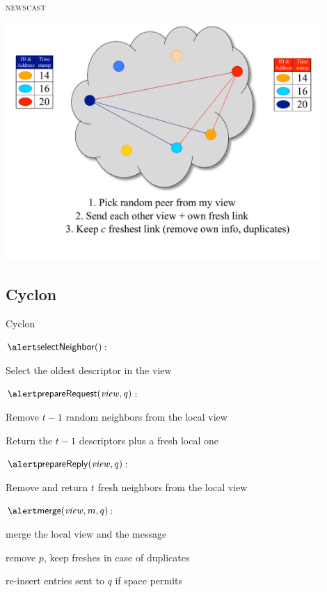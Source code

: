 \begin{frame}{\textsc{newscast}}
\begin{overprint}
\includegraphics[width=0.9\textwidth]{10_newscast}
\end{overprint}
\end{frame}

\subsection{Cyclon}

\begin{frame}{Cyclon}
	
\BI
\item $\SelectNeighbor()$:
\BI
\item Select the oldest descriptor in the view
\EI
\item $\ExtractRequest(\View, q)$:
\BI
  \item Remove $t-1$ random neighbors from the local view
  \item Return the $t-1$ descriptors plus a fresh local one
\EI
\item $\ExtractReply(\View, q)$:
  \BI
  \item Remove and return $t$ fresh neighbors from the local view
  \EI
\item $\Merge(\View, m, q)$:
\BI
\item merge the local view and the message
\item remove $p$, keep freshes in case of duplicates
\item re-insert entries sent to $q$ if space permits
\EI
\EI
	
\begin{Bib}
\end{Bib}	
	
\end{frame}



